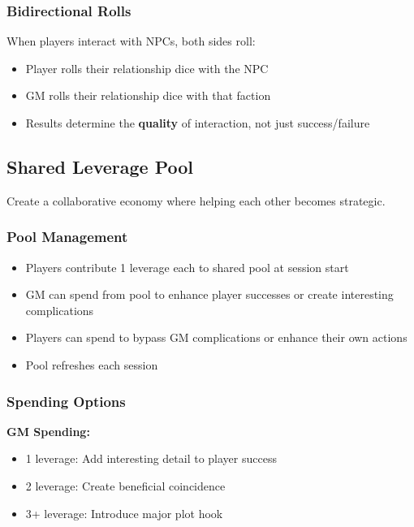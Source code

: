\subsubsection{Bidirectional Rolls}

When players interact with NPCs, both sides roll:
\begin{itemize}
\item Player rolls their relationship dice with the NPC
\item GM rolls their relationship dice with that faction
\item Results determine the \textbf{quality} of interaction, not just success/failure
\end{itemize}

\subsection{Shared Leverage Pool}

Create a collaborative economy where helping each other becomes strategic.

\subsubsection{Pool Management}

\begin{itemize}
\item Players contribute 1 leverage each to shared pool at session start
\item GM can spend from pool to enhance player successes or create interesting complications
\item Players can spend to bypass GM complications or enhance their own actions
\item Pool refreshes each session
\end{itemize}

\subsubsection{Spending Options}

\textbf{GM Spending:}
\begin{itemize}
\item 1 leverage: Add interesting detail to player success
\item 2 leverage: Create beneficial coincidence
\item 3+ leverage: Introduce major plot hook
\end{itemize}


